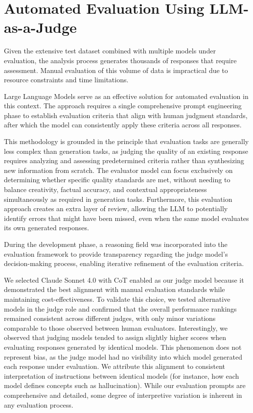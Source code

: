 \section{Automated Evaluation Using LLM-as-a-Judge}

Given the extensive test dataset combined with multiple models under evaluation, the analysis process generates thousands of responses that require assessment.
Manual evaluation of this volume of data is impractical due to resource constraints and time limitations.

Large Language Models serve as an effective solution for automated evaluation in this context.
The approach requires a single comprehensive prompt engineering phase to establish evaluation criteria that align with human judgment standards, after which the model can consistently apply these criteria across all responses.

This methodology is grounded in the principle that evaluation tasks are generally less complex than generation tasks, as judging the quality of an existing response requires analyzing and assessing predetermined criteria rather than synthesizing new information from scratch.
The evaluator model can focus exclusively on determining whether specific quality standards are met, without needing to balance creativity, factual accuracy, and contextual appropriateness simultaneously as required in generation tasks.
Furthermore, this evaluation approach creates an extra layer of review, allowing the LLM to potentially identify errors that might have been missed, even when the same model evaluates its own generated responses.

During the development phase, a reasoning field was incorporated into the evaluation framework to provide transparency regarding the judge model's decision-making process, enabling iterative refinement of the evaluation criteria.

We selected Claude Sonnet 4.0 with CoT enabled as our judge model because it demonstrated the best alignment with manual evaluation standards while maintaining cost-effectiveness.
To validate this choice, we tested alternative models in the judge role and confirmed that the overall performance rankings remained consistent across different judges, with only minor variations comparable to those observed between human evaluators.
Interestingly, we observed that judging models tended to assign slightly higher scores when evaluating responses generated by identical models. This phenomenon does not represent bias, as the judge model had no visibility into which model generated each response under evaluation.
We attribute this alignment to consistent interpretation of instructions between identical models (for instance, how each model defines concepts such as hallucination).
While our evaluation prompts are comprehensive and detailed, some degree of interpretive variation is inherent in any evaluation process.

